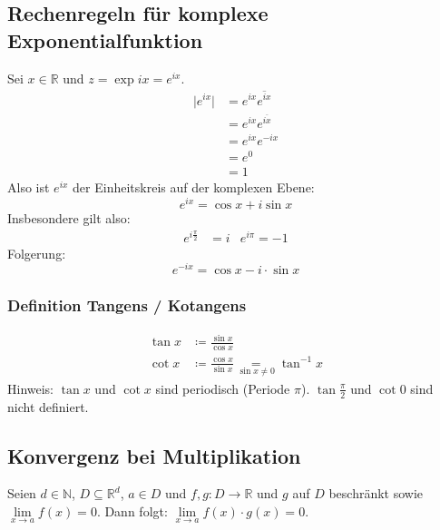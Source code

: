 \documentclass[halfparscip]{scrartcl}
\newcounter{subsection2}
\begin{document}
\subsection*{Rechenregeln für komplexe Exponentialfunktion}
Sei $x \in \mathbb{R}$ und $z = \exp ix = e^{ix}$.
\begin{align*}
	\vert e^{ix}\vert & = e^{ix}\overline{e^{ix}} \\
	                  & = e^{ix}e^{\overline{ix}} \\
	                  & = e^{ix}e^{-ix}           \\
	                  & = e^0                     \\
	                  & = 1
\end{align*}
Also ist $e^{ix}$ der Einheitskreis auf der komplexen Ebene:
\begin{equation*}
	e^{ix} = \cos x + i \sin x
\end{equation*}
Insbesondere gilt also:
\begin{align*}
	e^{i\frac{\pi}{2}} &= i & e^{i\pi} = -1
\end{align*}
Folgerung:
\begin{equation*}
	e^{-ix} = \cos x - i \cdot \sin x
\end{equation*}

\subsubsection*{Definition Tangens / Kotangens}
\begin{align*}
	\tan x & \coloneqq \frac{\sin x}{\cos x}                                         \\
	\cot x & \coloneqq \frac{\cos x}{\sin x} \underset{\sin x \neq 0}{=} \tan^{-1} x
\end{align*}
Hinweis: $\tan x$ und $\cot x$ sind periodisch (Periode $\pi$). $\tan \frac{\pi}{2}$ und $\cot 0$ sind nicht definiert.

\subsection{Konvergenz bei Multiplikation}
Seien $d \in \mathbb{N}$, $D \subseteq \mathbb{R}^d$, $a \in D$ und $f,g : D \rightarrow \mathbb{R}$ und $g$ auf $D$ beschränkt sowie \mbox{$\lim\limits_{x \rightarrow a} f(x) = 0$}.
Dann folgt: $\lim\limits_{x \rightarrow a} f(x) \cdot g(x) = 0$.
\end{document}
